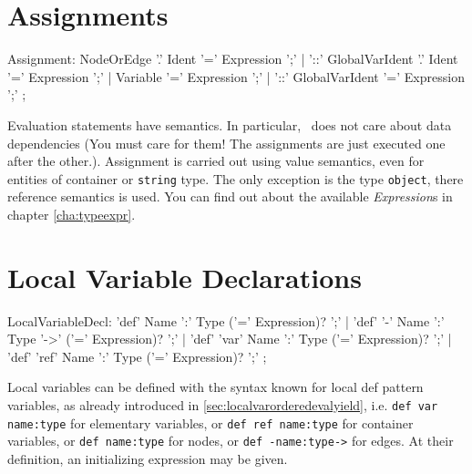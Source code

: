\section{Assignments} \label{sub:assignments}

\begin{rail}
  Assignment:
	  NodeOrEdge '.' Ident '=' Expression ';' |
	  '::' GlobalVarIdent '.' Ident '=' Expression ';' |
	  Variable '=' Expression ';' |
	  '::' GlobalVarIdent '=' Expression ';'
	;
\end{rail}

Evaluation statements have  semantics.
In particular, \GrG\ does not care about data dependencies (You must care for them! The assignments are just executed one after the other.).
Assignment is carried out using value semantics, even for entities of container or \texttt{string} type.
The only exception is the type \texttt{object}, there reference semantics is used.
You can find out about the available \emph{Expression}s in chapter \ref{cha:typeexpr}.


\section{Local Variable Declarations} 

\begin{rail} 
  LocalVariableDecl: 
	'def' Name ':' Type ('=' Expression)? ';' |
	'def' '-' Name ':' Type '->' ('=' Expression)? ';' |
	'def' 'var' Name ':' Type ('=' Expression)? ';' |
	'def' 'ref' Name ':' Type ('=' Expression)? ';'
	;
\end{rail}

Local variables can be defined with the syntax known for local def pattern variables, as already introduced in \ref{sec:localvarorderedevalyield}, i.e. \texttt{def var name:type} for elementary variables, or \texttt{def ref name:type} for container variables, or \texttt{def name:type} for nodes, or \texttt{def -name:type->} for edges.
At their definition, an initializing expression may be given.

